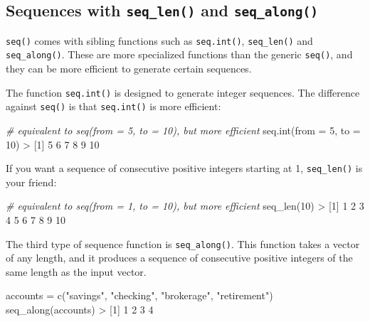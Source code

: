 \documentclass[
]{book}
\newenvironment{Shaded}{\begin{snugshade}}{\end{snugshade}}
\newcommand{\AttributeTok}[1]{\textcolor[rgb]{0.77,0.63,0.00}{#1}}
\newcommand{\CommentTok}[1]{\textcolor[rgb]{0.56,0.35,0.01}{\textit{#1}}}
\newcommand{\DecValTok}[1]{\textcolor[rgb]{0.00,0.00,0.81}{#1}}
\newcommand{\FunctionTok}[1]{\textcolor[rgb]{0.00,0.00,0.00}{#1}}
\newcommand{\NormalTok}[1]{#1}
\newcommand{\OtherTok}[1]{\textcolor[rgb]{0.56,0.35,0.01}{#1}}
\newcommand{\SpecialCharTok}[1]{\textcolor[rgb]{0.00,0.00,0.00}{#1}}
\newcommand{\StringTok}[1]{\textcolor[rgb]{0.31,0.60,0.02}{#1}}
\begin{document}
\hypertarget{sequences-with-seq_len-and-seq_along}{%
\subsection{\texorpdfstring{Sequences with \texttt{seq\_len()} and \texttt{seq\_along()}}{Sequences with seq\_len() and seq\_along()}}\label{sequences-with-seq_len-and-seq_along}}

\texttt{seq()} comes with sibling functions such as \texttt{seq.int()}, \texttt{seq\_len()} and
\texttt{seq\_along()}. These are more specialized functions than the generic \texttt{seq()},
and they can be more efficient to generate certain sequences.

The function \texttt{seq.int()} is designed to generate integer sequences. The
difference against \texttt{seq()} is that \texttt{seq.int()} is more efficient:

\begin{Shaded}
\begin{Highlighting}[]
\CommentTok{\# equivalent to seq(from = 5, to = 10), but more efficient}
\FunctionTok{seq.int}\NormalTok{(}\AttributeTok{from =} \DecValTok{5}\NormalTok{, }\AttributeTok{to =} \DecValTok{10}\NormalTok{)}
\SpecialCharTok{\textgreater{}}\NormalTok{ [}\DecValTok{1}\NormalTok{]  }\DecValTok{5}  \DecValTok{6}  \DecValTok{7}  \DecValTok{8}  \DecValTok{9} \DecValTok{10}
\end{Highlighting}
\end{Shaded}

If you want a sequence of consecutive positive integers starting at 1,
\texttt{seq\_len()} is your friend:

\begin{Shaded}
\begin{Highlighting}[]
\CommentTok{\# equivalent to seq(from = 1, to = 10), but more efficient}
\FunctionTok{seq\_len}\NormalTok{(}\DecValTok{10}\NormalTok{)}
\SpecialCharTok{\textgreater{}}\NormalTok{  [}\DecValTok{1}\NormalTok{]  }\DecValTok{1}  \DecValTok{2}  \DecValTok{3}  \DecValTok{4}  \DecValTok{5}  \DecValTok{6}  \DecValTok{7}  \DecValTok{8}  \DecValTok{9} \DecValTok{10}
\end{Highlighting}
\end{Shaded}

The third type of sequence function is \texttt{seq\_along()}. This function takes
a vector of any length, and it produces a sequence of consecutive positive
integers of the same length as the input vector.

\begin{Shaded}
\begin{Highlighting}[]
\NormalTok{accounts }\OtherTok{=} \FunctionTok{c}\NormalTok{(}\StringTok{"savings"}\NormalTok{, }\StringTok{"checking"}\NormalTok{, }\StringTok{"brokerage"}\NormalTok{, }\StringTok{"retirement"}\NormalTok{)}
\FunctionTok{seq\_along}\NormalTok{(accounts)}
\SpecialCharTok{\textgreater{}}\NormalTok{ [}\DecValTok{1}\NormalTok{] }\DecValTok{1} \DecValTok{2} \DecValTok{3} \DecValTok{4}
\end{Highlighting}
\end{Shaded}
\end{document}
